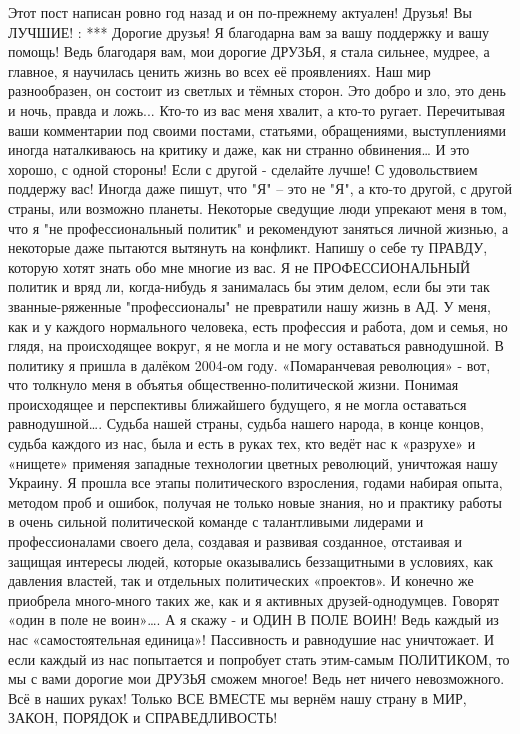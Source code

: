\obeycr
Этот пост написан ровно год назад и он по-прежнему актуален!
Друзья! Вы ЛУЧШИЕ! :
***
Дорогие друзья!
Я благодарна вам за вашу поддержку и вашу помощь!
Ведь благодаря вам, мои дорогие ДРУЗЬЯ, я стала сильнее, мудрее, а главное, я научилась ценить жизнь во всех её проявлениях.
Наш мир разнообразен, он состоит из светлых и тёмных сторон.
Это добро и зло, это день и ночь, правда и ложь...
Кто-то из вас меня хвалит, а кто-то ругает.
Перечитывая ваши комментарии под своими постами, статьями, обращениями, выступлениями иногда наталкиваюсь на критику и даже, как ни странно обвинения…
И это хорошо, с одной стороны!
Если с другой - сделайте лучше!
С удовольствием поддержу вас!
Иногда даже пишут, что "Я" – это не "Я", а кто-то другой, с другой страны, или возможно планеты.
Некоторые сведущие люди упрекают меня в том, что я "не профессиональный политик" и рекомендуют заняться личной жизнью, а некоторые даже пытаются вытянуть на конфликт.
Напишу о себе ту ПРАВДУ, которую хотят знать обо мне многие из вас.
Я не ПРОФЕССИОНАЛЬНЫЙ политик и вряд ли, когда-нибудь я занималась бы этим делом, если бы эти так званные-ряженные "профессионалы" не превратили нашу жизнь в АД.
У меня, как и у каждого нормального человека, есть профессия и работа, дом и семья, но глядя, на происходящее вокруг, я не могла и не могу оставаться равнодушной.
В политику я пришла в далёком 2004-ом году.
«Помаранчевая революция» - вот, что толкнуло меня в объятья общественно-политической жизни.
Понимая происходящее и перспективы ближайшего будущего, я не могла оставаться равнодушной….
Судьба нашей страны, судьба нашего народа, в конце концов, судьба каждого из нас, была и есть в руках тех, кто ведёт нас к «разрухе» и «нищете» применяя западные технологии цветных революций, уничтожая нашу Украину.
Я прошла все этапы политического взросления, годами набирая опыта, методом проб и ошибок, получая не только новые знания, но и практику работы в очень сильной политической команде с талантливыми лидерами и профессионалами своего дела, создавая и развивая созданное, отстаивая и защищая интересы людей, которые оказывались беззащитными в условиях, как давления властей, так и отдельных политических «проектов».
И конечно же приобрела много-много таких же, как и я активных друзей-однодумцев.
Говорят «один в поле не воин»….
А я скажу - и ОДИН В ПОЛЕ ВОИН!
Ведь каждый из нас «самостоятельная единица»!
Пассивность и равнодушие нас уничтожает.
И если каждый из нас попытается и попробует стать этим-самым ПОЛИТИКОМ, то мы с вами дорогие мои ДРУЗЬЯ сможем многое!
Ведь нет ничего невозможного.
Всё в наших руках!
Только ВСЕ ВМЕСТЕ мы вернём нашу страну в МИР, ЗАКОН, ПОРЯДОК и СПРАВЕДЛИВОСТЬ!

